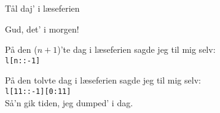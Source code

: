 \begin{song}{Tål daj' i læseferien}
  \begin{SBVerse}
    Gud, det' i morgen!
  \end{SBVerse}

  \renewcommand{\theSBVerseCnt}{$n<11$}

  \begin{SBVerse}
    På den ($n+1$)'te dag i læseferien sagde jeg til mig selv:\\
    \texttt{l[n::-1]}
  \end{SBVerse}

  \renewcommand{\theSBVerseCnt}{$11$}

  \begin{SBVerse}
    På den tolvte dag i læseferien sagde jeg til mig selv:\\
    \texttt{l[11::-1][0:11]}\\
    Så'n gik tiden, jeg dumped' i dag.
  \end{SBVerse}

\end{song}
